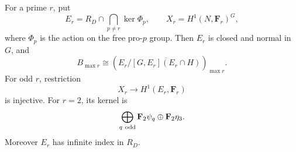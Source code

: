 \begin{theorem}
\label{thm:primary-residual-gate}
For a prime \(r\), put
\[
 E_r=R_D\cap\bigcap_{p\ne r}\ker\Phi_p,
 \qquad X_r=H^1(N,\mathbf F_r)^G,
\]
where \(\Phi_p\) is the action on the free pro-\(p\) group.
Then \(E_r\) is closed and normal in \(G\), and
\begin{equation}
 B_{\max r}\cong
 \left(E_r/\overline{[G,E_r](E_r\cap H)}\right)_{\max r}. \label{eq:primary-residual-1}
\end{equation}
For odd \(r\), restriction
\[
 X_r\longrightarrow H^1(E_r,\mathbf F_r)
\]
is injective.
For \(r=2\), its kernel is
\begin{equation}
 \bigoplus_{q\ {\rm odd}}\mathbf F_2\psi_q
                         \oplus\mathbf F_2\eta_3.       \label{eq:primary-residual-2}
\end{equation}
Moreover \(E_r\) has infinite index in \(R_D\).
\end{theorem}

